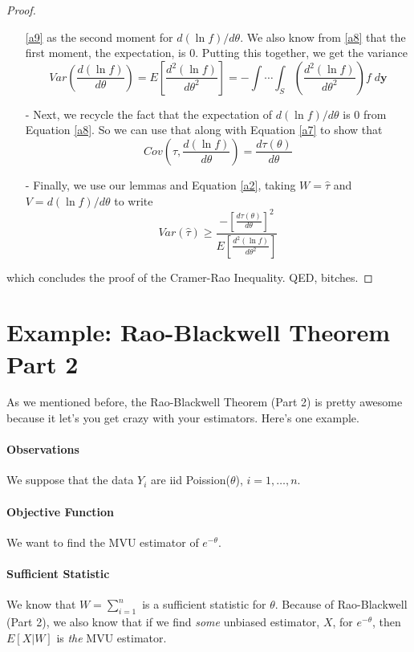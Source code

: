 \documentclass[a4paper,12pt]{scrartcl}
\begin{document}
\begin{proof}
\begin{itemize}
{	 \ref{a9} as the second moment for $d(\ln f)/ d\theta$. We
	 also know from \ref{a8} that the first moment, the expectation,
	 is 0. Putting this together, we get the variance
	 \begin{equation}
	    \label{a10}
	    Var\left( \frac{d(\ln f)}{d\theta}\right) = E\left[
	       \frac{d^2(\ln f)}{d\theta^2} \right] = 
	       - \int \cdots \int_S  \left(
	       \frac{d^2(\ln f)}{d\theta^2}\right) f \; d\mathbf{y} 
	 \end{equation}
      }
      \item[-]{Next, we recycle the fact that the expectation of 
	 $d(\ln f)/ d\theta$ is 0 from Equation \ref{a8}. So we can use
	 that along with Equation \ref{a7} to show that
	 \begin{equation}
	    \label{a11}
	    Cov\left( \hat{\tau}, \frac{d(\ln f)}{ d\theta} \right)
	    = \frac{d\tau(\theta)}{d\theta}
	 \end{equation}
	 }
      \item[-]{Finally, we use our lemmas and Equation \ref{a2}, taking
	 $W = \hat{\tau}$ and $V = d(\ln f)/ d\theta$ to write
	 \[ Var(\hat{\tau}) \geq 
	    \frac{-\left[ \frac{d\tau(\theta)}{d\theta}\right]^2}{
	    E\left[ \frac{d^2(\ln f)}{d\theta^2} \right]}\]
      }
   \end{itemize}
   which concludes the proof of the Cramer-Rao Inequality. QED, bitches.
\end{proof}



\newpage
\section{Example: Rao-Blackwell Theorem Part 2}

As we mentioned before, the Rao-Blackwell Theorem (Part 2) 
is pretty awesome
because it let's you get crazy with your estimators.  Here's one 
example.

\paragraph{Observations} We suppose that the data $Y_i$ are iid 
Poission($\theta$), $i=1,\ldots,n$.

\paragraph{Objective Function} We want to find the MVU estimator of
$e^{-\theta}$.

\paragraph{Sufficient Statistic} We know that $W = \sum^n_{i=1}$ is
a sufficient statistic for $\theta$.  Because of Rao-Blackwell (Part 2),
we also know that if we find \emph{some} unbiased estimator, $X$, for
$e^{-\theta}$, then $E[X|W]$ is \emph{the} MVU estimator.
\end{document}
